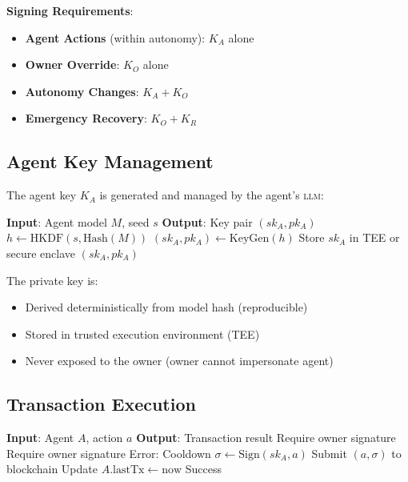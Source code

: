 \documentclass[11pt,letterpaper]{article}
\newcommand{\LLM}{\textsc{llm}}
\begin{document}
\textbf{Signing Requirements}:
\begin{itemize}
    \item \textbf{Agent Actions} (within autonomy): $K_A$ alone
    \item \textbf{Owner Override}: $K_O$ alone
    \item \textbf{Autonomy Changes}: $K_A + K_O$
    \item \textbf{Emergency Recovery}: $K_O + K_R$
\end{itemize}

\subsection{Agent Key Management}

The agent key $K_A$ is generated and managed by the agent's \LLM{}:

\begin{algorithm}[t]
\caption{Agent Key Generation}
\label{alg:keygen}
\begin{algorithmic}[1]
\STATE \textbf{Input}: Agent model $M$, seed $s$
\STATE \textbf{Output}: Key pair $(sk_A, pk_A)$
\STATE $h \leftarrow \text{HKDF}(s, \text{Hash}(M))$
\STATE $(sk_A, pk_A) \leftarrow \text{KeyGen}(h)$
\STATE Store $sk_A$ in TEE or secure enclave
\RETURN $(sk_A, pk_A)$
\end{algorithmic}
\end{algorithm}

The private key is:
\begin{itemize}
    \item Derived deterministically from model hash (reproducible)
    \item Stored in trusted execution environment (TEE)
    \item Never exposed to the owner (owner cannot impersonate agent)
\end{itemize}

\subsection{Transaction Execution}

\begin{algorithm}[t]
\caption{Agent Transaction Execution}
\label{alg:tx}
\begin{algorithmic}[1]
\STATE \textbf{Input}: Agent $A$, action $a$
\STATE \textbf{Output}: Transaction result
\STATE {}
    \STATE Require owner signature
\ENDIF
{}
    \STATE Require owner signature
\ENDIF
\STATE {}
    \RETURN Error: Cooldown
\ENDIF
\STATE {}
\STATE $\sigma \leftarrow \text{Sign}(sk_A, a)$
\STATE Submit $(a, \sigma)$ to blockchain
\STATE Update $A.\text{lastTx} \leftarrow \text{now}$
\RETURN Success
\end{algorithmic}
\end{algorithm}
\end{document}
